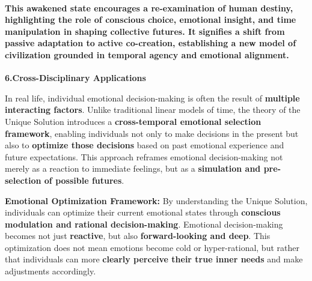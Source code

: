 \documentclass[a4paper]{article}
\begin{document}
\paragraph[This awakened state encourages a re{}-examination of human destiny, highlighting the role of conscious
choice, emotional insight, and time manipulation in shaping collective futures. It signifies a shift from passive
adaptation to active co{}-creation, establishing a new model of civilization grounded in temporal agency and emotional
alignment.]{This awakened state encourages a re-examination of human destiny, highlighting the role of conscious
choice, emotional insight, and time manipulation in shaping collective futures. It signifies a shift from passive
adaptation to active co-creation, establishing a new model of civilization grounded in temporal agency and emotional
alignment.}
{\centering\color[HTML]{595959}
\textbf{6.Cross-Disciplinary Applications}
\par}

In real life, individual emotional decision-making is often the result of \textbf{multiple interacting factors}. Unlike
traditional linear models of time, the theory of the Unique Solution introduces a \textbf{cross-temporal emotional
selection framework}, enabling individuals not only to make decisions in the present but also to \textbf{optimize those
decisions} based on past emotional experience and future expectations. This approach reframes emotional decision-making
not merely as a reaction to immediate feelings, but as a \textbf{simulation and pre-selection of possible futures}.

\textbf{Emotional Optimization Framework: }By understanding the Unique Solution, individuals can optimize their current
emotional states through \textbf{conscious modulation and rational decision-making}. Emotional decision-making becomes
not just \textbf{reactive}, but also \textbf{forward-looking and deep}. This optimization does not mean emotions become
cold or hyper-rational, but rather that individuals can more \textbf{clearly perceive their true inner needs} and make
adjustments accordingly.
\end{document}
